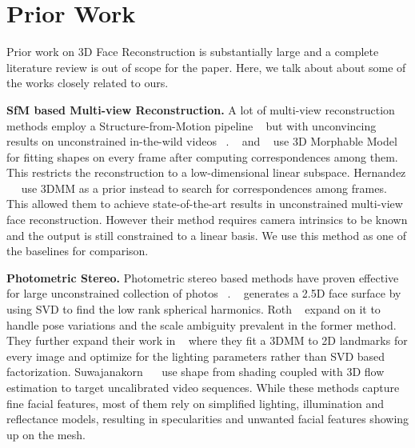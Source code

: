 \documentclass[10pt,twocolumn,letterpaper]{article}
\begin{document}
\section{Prior Work}
Prior work on 3D Face Reconstruction is substantially large and a complete literature review is out of scope for the paper. Here, we talk about about some of the works closely related to ours.

\noindent \textbf{SfM based Multi-view Reconstruction.} A lot of multi-view reconstruction methods employ a Structure-from-Motion pipeline ~\cite{gotardo2015photogeometric, lin2010accurate, fidaleo2007model} but with unconvincing results on unconstrained in-the-wild videos ~\cite{hernandez2017accurate}. ~\cite{brand2001morphable} and ~\cite{shi2014automatic} use 3D Morphable Model~\cite{blanz1999morphable} for fitting shapes on every frame after computing correspondences among them. This restricts the reconstruction to a low-dimensional linear subspace. Hernandez ~\etal ~\cite{hernandez2017accurate} use 3DMM as a prior instead to search for correspondences among frames. This allowed them to achieve state-of-the-art results in unconstrained multi-view face reconstruction. However their method requires camera intrinsics to be known and the output is still constrained to a linear basis. We use this method as one of the baselines for comparison.

\noindent \textbf{Photometric Stereo.} Photometric stereo based methods have proven effective for large unconstrained collection of photos ~\cite{kemelmacher2011face, kemelmacher2013internet, roth2015unconstrained}. ~\cite{kemelmacher2011face} generates a 2.5D face surface by using SVD to find the low rank spherical harmonics. Roth \etal ~\cite{roth2015unconstrained} expand on it to handle pose variations and the scale ambiguity prevalent in the former method. They further expand their work in ~\cite{roth2016adaptive} where they fit a 3DMM to 2D landmarks for every image and optimize for the lighting parameters rather than SVD based factorization. Suwajanakorn ~\etal ~\cite{suwajanakorn2014total} use shape from shading coupled with 3D flow estimation to target uncalibrated video sequences. While these methods capture fine facial features, most of them rely on simplified lighting, illumination and reflectance models, resulting in specularities and unwanted facial features showing up on the mesh.
\end{document}
